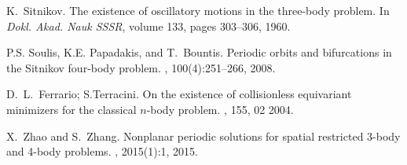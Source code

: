 \documentclass[smallcondensed]{svjour3}
\begin{document}
\begin{thebibliography}{10}
K.~{S}itnikov.
\newblock The existence of oscillatory motions in the three-body problem.
\newblock In {\em Dokl. Akad. Nauk SSSR}, volume 133, pages 303--306, 1960.

P.S. Soulis, K.E. Papadakis, and T.~Bountis.
\newblock Periodic orbits and bifurcations in the {S}itnikov four-body problem.
, 100(4):251--266,
  2008.

D.~L.~Ferrario; S.Terracini.
\newblock On the existence of collisionless equivariant minimizers for the
  classical $n$-body problem.
, 155, 02 2004.

X.~Zhao and S.~Zhang.
\newblock Nonplanar periodic solutions for spatial restricted 3-body and 4-body
  problems.
, 2015(1):1, 2015.

\end{thebibliography}
\end{document}
